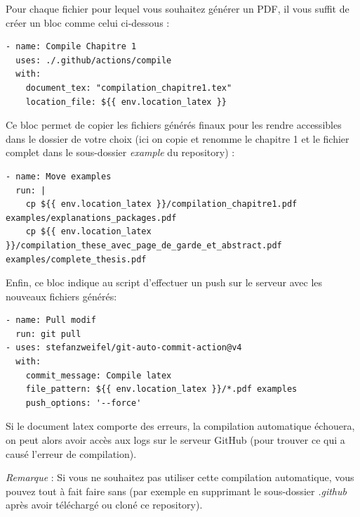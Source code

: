 Pour chaque fichier pour lequel vous souhaitez générer un PDF, il vous suffit de créer un bloc comme celui ci-dessous :
\begin{lstlisting}
- name: Compile Chapitre 1
  uses: ./.github/actions/compile
  with:
    document_tex: "compilation_chapitre1.tex"
    location_file: ${{ env.location_latex }}
\end{lstlisting}

Ce bloc permet de copier les fichiers générés finaux pour les rendre accessibles dans le dossier de votre choix (ici on copie et renomme le chapitre 1 et le fichier complet dans le sous-dossier \textit{example} du repository) :
\begin{lstlisting}
- name: Move examples
  run: |
    cp ${{ env.location_latex }}/compilation_chapitre1.pdf examples/explanations_packages.pdf
    cp ${{ env.location_latex }}/compilation_these_avec_page_de_garde_et_abstract.pdf examples/complete_thesis.pdf
\end{lstlisting}

Enfin, ce bloc indique au script d'effectuer un push sur le serveur avec les nouveaux fichiers générés:
\begin{lstlisting}
- name: Pull modif
  run: git pull
- uses: stefanzweifel/git-auto-commit-action@v4
  with:
    commit_message: Compile latex
    file_pattern: ${{ env.location_latex }}/*.pdf examples
    push_options: '--force'
\end{lstlisting}

Si le document latex comporte des erreurs, la compilation automatique échouera, on peut alors avoir accès aux logs sur le serveur GitHub (pour trouver ce qui a causé l'erreur de compilation).\bigskip

\emph{Remarque} : Si vous ne souhaitez pas utiliser cette compilation automatique, vous pouvez tout à fait faire sans (par exemple en supprimant le sous-dossier \textit{.github} après avoir téléchargé ou cloné ce repository).